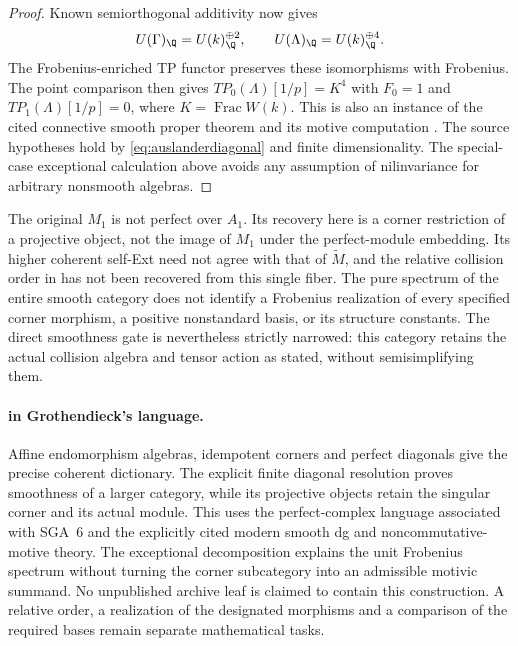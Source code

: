 \begin{proof}
Known semiorthogonal additivity
\cite[Example~12.3, p.~24]{TabuadaWeil} now gives
\[
 U(\Gamma)_{\Q}=U(k)_{\Q}^{\oplus2},\qquad
 U(\Lambda)_{\Q}=U(k)_{\Q}^{\oplus4}.
\]
The Frobenius-enriched TP functor
\cite[\S6.2, equation~(6.9), p.~16]{TabuadaWeil}
preserves these isomorphisms with Frobenius. The point comparison
\cite[\S7, equations~(7.1)--(7.4), p.~17]{TabuadaWeil}
then gives $TP_0(\Lambda)[1/p]=K^4$ with $F_0=1$ and
$TP_1(\Lambda)[1/p]=0$, where $K=\operatorname{Frac}W(k)$.
This is also an instance of the cited connective smooth proper
theorem and its motive computation
\cite[Theorem~2.12, p.~8; proof, equation~(12.6), p.~26]{TabuadaWeil}.
The source hypotheses hold by \eqref{eq:auslanderdiagonal} and
finite dimensionality. The special-case exceptional calculation
above avoids any assumption of nilinvariance for arbitrary
nonsmooth algebras.
\end{proof}

The original $M_1$ is not perfect over $A_1$. Its recovery here
is a corner restriction of a projective object, not the image of
$M_1$ under the perfect-module embedding. Its higher coherent
self-Ext need not agree with that of $\widetilde M$, and the
relative collision order in  has not been recovered
from this single fiber. The pure spectrum of the entire smooth
category does not identify a Frobenius realization of every
specified corner morphism, a positive nonstandard basis, or its
structure constants. The direct smoothness gate is nevertheless
strictly narrowed: this category retains the actual collision
algebra and tensor action as stated, without semisimplifying them.

\paragraph{ in Grothendieck's language.}
Affine endomorphism algebras, idempotent corners and perfect
diagonals give the precise coherent dictionary. The explicit
finite diagonal resolution proves smoothness of a larger category,
while its projective objects retain the singular corner and its
actual module. This uses the perfect-complex language associated
with SGA~6 and the explicitly cited modern smooth dg and
noncommutative-motive theory. The exceptional decomposition
explains the unit Frobenius spectrum without turning the corner
subcategory into an admissible motivic summand. No unpublished
archive leaf is claimed to contain this construction. A relative
order, a realization of the designated morphisms and a comparison
of the required bases remain separate mathematical tasks.
